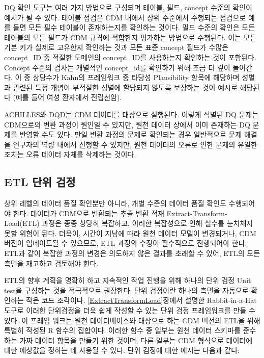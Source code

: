 \documentclass[10.5pt]{book}
\theoremstyle{definition}
\theoremstyle{definition}
\theoremstyle{definition}
\theoremstyle{remark}
\let\BeginKnitrBlock\begin \let\EndKnitrBlock\end
\begin{document}
DQ 확인 도구는 여러 가지 방법으로 구성되며 테이블, 필드, concept 수준의
확인이 예시가 될 수 있다. 테이블 점검은 CDM 내에서 상위 수준에서
수행되는 점검으로 예를 들면 모든 필수 테이블이 존재하는지를 확인하는
것이다. 필드 수준의 확인은 모든 테이블의 모든 필드가 CDM 규격에 적합한지
평가하는 방법으로 수행된다. 이는 모든 기본 키가 실제로 고유한지 확인하는
것과 모든 표준 concept 필드가 수많은 concept\_ID 중 적절한 도메인의
concept\_ID를 사용하는지 확인하는 것이 포함된다. Concept 수준의 검사는
개별적인 concept\_id를 확인하기 위해 조금 더 깊이 들어간다. 이 중
상당수가 Kahn의 프레임워크 중 타당성 Plausibility 항목에 해당하며 성별과
관련된 특정 개념이 부적절한 성별에 할당되지 않도록 보장하는 것이 예시로
해당된다 (예를 들어 여성 환자에서 전립선암).

\BeginKnitrBlock{rmdimportant}
ACHILLES와 DQD는 CDM 데이터를 대상으로 실행된다. 이렇게 식별된 DQ 문제는
CDM으로의 변환 과정이 원인일 수 있지만, 원천 데이터 상에서 이미 존재하는
DQ 문제를 반영할 수도 있다. 만일 변환 과정의 문제로 확인되는 경우
일반적으로 문제 해결을 연구자의 역량 내에서 진행할 수 있지만, 원천
데이터의 오류로 인한 문제의 유일한 조치는 오류 데이터 자체를 삭제하는
것이다.
\EndKnitrBlock{rmdimportant}

\subsection{ETL 단위 검정}\label{etlUnitTests}


상위 레벨의 데이터 품질 확인뿐만 아니라, 개별 수준의 데이터 품질 확인도
수행되어야 한다. 데이터가 CDM으로 변환되는 추출 변환 적재
Extract-Transform-Load(ETL) 과정은 종종 상당히 복잡하고, 이러한
복잡성으로 인해 실수를 눈치채지 못할 위험이 된다. 더욱이, 시간이 지남에
따라 원천 데이터 모델이 변경되거나, CDM 버전이 업데이트될 수 있으므로,
ETL 과정의 수정이 필수적으로 진행되어야 한다. ETL과 같이 복잡한 과정의
변경은 의도하지 않은 결과를 초래할 수 있어, ETL의 모든 측면을 재고하고
검토해야 한다.

ETL의 향후 계획을 명확히 하고 지속적인 작업 진행을 위해 하나의 단위 검정
Unit test을 구성하는 것을 적극적으로 권장한다. 단위 검정이란 하나의
측면을 자동으로 확인하는 작은 코드 조각이다.
\ref{ExtractTransformLoad}장에서 설명한 Rabbit-in-a-Hat 도구로 이러한
단위검정을 더욱 쉽게 작성할 수 있는 단위 검정 프레임워크를 만들 수 있다.
이 프레임 워크는 원천 데이터베이스와 대상으로 하는 CDM 버전의 ETL을 위해
특별히 작성된 R 함수의 집합이다. 이러한 함수 중 일부는 원천 데이터
스키마를 준수하는 가짜 데이터 항목을 만들기 위한 것이며, 다른 일부는 CDM
형식으로 데이터에 대한 예상값을 정하는 데 사용될 수 있다. 단위 검정에
대한 예시는 다음과 같다:
\end{document}

